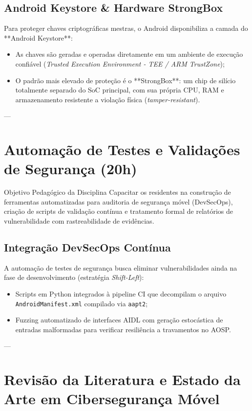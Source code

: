 \subsection{Android Keystore \& Hardware StrongBox}
Para proteger chaves criptográficas mestras, o Android disponibiliza a camada do **Android Keystore**:
\begin{itemize}
    \item As chaves são geradas e operadas diretamente em um ambiente de execução confiável (\textit{Trusted Execution Environment - TEE / ARM TrustZone});
    \item O padrão mais elevado de proteção é o **StrongBox**: um chip de silício totalmente separado do SoC principal, com sua própria CPU, RAM e armazenamento resistente a violação física (\textit{tamper-resistant}).
\end{itemize}

---

\section{Automação de Testes e Validações de Segurança (20h)}

\begin{pedagogico}{Objetivo Pedagógico da Disciplina}
Capacitar os residentes na construção de ferramentas automatizadas para auditoria de segurança móvel (DevSecOps), criação de scripts de validação contínua e tratamento formal de relatórios de vulnerabilidade com rastreabilidade de evidências.
\end{pedagogico}

\subsection{Integração DevSecOps Contínua}
A automação de testes de segurança busca eliminar vulnerabilidades ainda na fase de desenvolvimento (estratégia \textit{Shift-Left}):
\begin{itemize}
    \item Scripts em Python integrados à pipeline CI que decompilam o arquivo \texttt{AndroidManifest.xml} compilado via \texttt{aapt2};
    \item Fuzzing automatizado de interfaces AIDL com geração estocástica de entradas malformadas para verificar resiliência a travamentos no AOSP.
\end{itemize}

---

\section{Revisão da Literatura e Estado da Arte em Cibersegurança Móvel}

